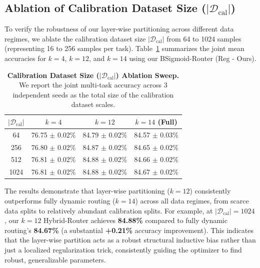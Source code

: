 \subsection{Ablation of Calibration Dataset Size ($|\mathcal{D}_{\text{cal}}|$)}
To verify the robustness of our layer-wise partitioning across different data regimes, we ablate the calibration dataset size $|\mathcal{D}_{\text{cal}}|$ from 64 to 1024 samples (representing 16 to 256 samples per task). Table~\ref{tab:cal_ablation} summarizes the joint mean accuracies for $k=4$, $k=12$, and $k=14$ using our BSigmoid-Router (Reg - Ours).

\begin{table}[h]
\caption{\textbf{Calibration Dataset Size ($|\mathcal{D}_{\text{cal}}|$) Ablation Sweep.} We report the joint multi-task accuracy across 3 independent seeds as the total size of the calibration dataset scales.}
\label{tab:cal_ablation}
\vskip 0.15in
\begin{center}
\begin{small}
\setlength{\tabcolsep}{3.5pt}
\begin{tabular}{cccc}
\toprule
$|\mathcal{D}_{\text{cal}}|$ & $k = 4$ & $k = 12$ & $k = 14$ (Full) \\
\midrule
64 & 76.75 $\pm$ 0.02\% & 84.79 $\pm$ 0.02\% & 84.57 $\pm$ 0.03\% \\
256 & 76.80 $\pm$ 0.02\% & 84.87 $\pm$ 0.02\% & 84.65 $\pm$ 0.02\% \\
512 & 76.81 $\pm$ 0.02\% & 84.88 $\pm$ 0.02\% & 84.66 $\pm$ 0.02\% \\
1024 & 76.81 $\pm$ 0.02\% & 84.88 $\pm$ 0.02\% & 84.67 $\pm$ 0.02\% \\
\bottomrule
\end{tabular}
\end{small}
\end{center}
\vskip -0.1in
\end{table}

The results demonstrate that layer-wise partitioning ($k=12$) consistently outperforms fully dynamic routing ($k=14$) across all data regimes, from scarce data splits to relatively abundant calibration splits. For example, at $|\mathcal{D}_{\text{cal}}| = 1024$, our $k=12$ Hybrid-Router achieves \textbf{84.88\%} compared to fully dynamic routing's \textbf{84.67\%} (a substantial \textbf{+0.21\%} accuracy improvement). This indicates that the layer-wise partition acts as a robust structural inductive bias rather than just a localized regularization trick, consistently guiding the optimizer to find robust, generalizable parameters.

